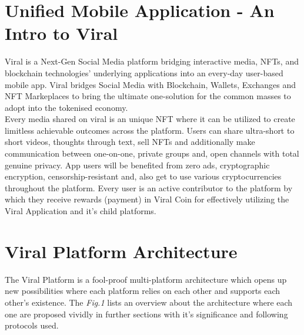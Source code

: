 \documentclass[conference]{IEEEtran}
\begin{document}
\section{\textbf{Unified Mobile Application - An Intro to Viral}}

Viral is a Next-Gen Social Media platform bridging interactive media, NFTs, and blockchain technologies' underlying applications into an every-day user-based mobile app. Viral bridges Social Media with Blockchain, Wallets, Exchanges and NFT Markeplaces to bring the ultimate one-solution for the common masses to adopt into the tokenised economy.\\

Every media shared on viral is an unique NFT where it can be utilized to create limitless achievable outcomes across the platform. Users can share ultra-short to short videos, thoughts through text, sell NFTs and additionally make communication between one-on-one, private groups and, open channels with total genuine privacy. App users will be benefited from zero ads, cryptographic encryption, censorship-resistant and, also get to use various cryptocurrencies throughout the platform. Every user is an active contributor to the platform by which they receive rewards (payment) in Viral Coin for effectively utilizing the Viral Application and it's child platforms.\\


\section{\textbf{Viral Platform Architecture}}

The Viral Platform is a fool-proof multi-platform architecture which opens up new possibilities where each platform relies on each other and supports each other's existence. The \textit{Fig.1} lists an overview about the architecture where each one are proposed vividly in further sections with it's significance and following protocols used.\\
\end{document}

